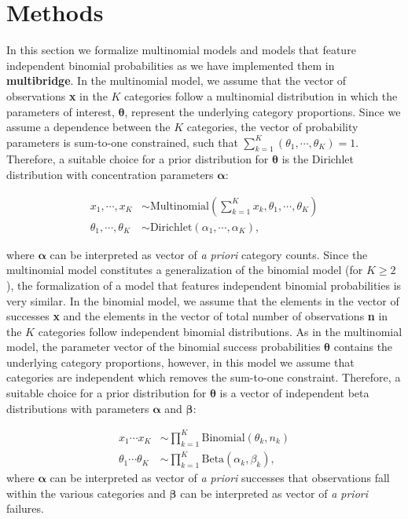 \documentclass[
  english,
  man,floatsintext]{apa6}
\begin{document}
\hypertarget{methods}{%
\section{Methods}\label{methods}}

In this section we formalize multinomial models and models that feature independent binomial probabilities as we have implemented them in \textbf{multibridge}. In the multinomial model, we assume that the vector of observations \textbf{x} in the \(K\) categories follow a multinomial distribution in which the parameters of interest, \(\boldsymbol{\theta}\), represent the underlying category proportions. Since we assume a dependence between the \(K\) categories, the vector of probability parameters is sum-to-one constrained, such that \(\sum_{k = 1}^K (\theta_1, \cdots, \theta_K) = 1\). Therefore, a suitable choice for a prior distribution for \(\boldsymbol{\theta}\) is the Dirichlet distribution with concentration parameters \(\boldsymbol{\alpha}\):

\begin{align}
  x_1, \cdots, x_K &\sim \text{Multinomial}(\sum_{k = 1}^K x_k, \theta_1, \cdots, \theta_K) \\
  \theta_1, \cdots, \theta_K &\sim \text{Dirichlet}(\alpha_1, \cdots, \alpha_K),
\end{align}

where \(\boldsymbol{\alpha}\) can be interpreted as vector of \emph{a priori} category counts. Since the multinomial model constitutes a generalization of the binomial model (for \(K \geq 2\)), the formalization of a model that features independent binomial probabilities is very similar. In the binomial model, we assume that the elements in the vector of successes \textbf{x} and the elements in the vector of total number of observations \textbf{n} in the \(K\) categories follow independent binomial distributions. As in the multinomial model, the parameter vector of the binomial success probabilities \(\boldsymbol{\theta}\) contains the underlying category proportions, however, in this model we assume that categories are independent which removes the sum-to-one constraint. Therefore, a suitable choice for a prior distribution for \(\boldsymbol{\theta}\) is a vector of independent beta distributions with parameters \(\boldsymbol{\alpha}\) and \(\boldsymbol{\beta}\):

\begin{align}
  x_1 \cdots x_K & \sim \prod_{k = 1}^K \text{Binomial}(\theta_k, n_k) \\
  \theta_1 \cdots \theta_K &\sim \prod_{k = 1}^K \text{Beta}(\alpha_k, \beta_k),
\end{align}
where \(\boldsymbol{\alpha}\) can be interpreted as vector of \emph{a priori} successes that observations fall within the various categories and \(\boldsymbol{\beta}\) can be interpreted as vector of \emph{a priori} failures.
\end{document}
